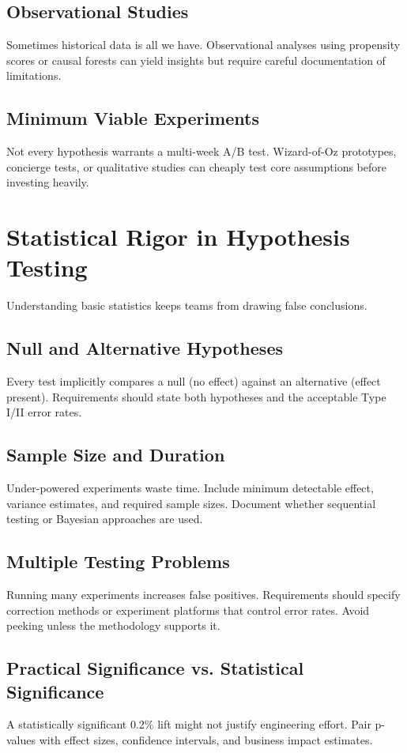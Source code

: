 \subsection{Observational Studies}
Sometimes historical data is all we have. Observational analyses using propensity scores or causal forests can yield insights but require careful documentation of limitations.

\subsection{Minimum Viable Experiments}
Not every hypothesis warrants a multi-week A/B test. Wizard-of-Oz prototypes, concierge tests, or qualitative studies can cheaply test core assumptions before investing heavily.

\section{Statistical Rigor in Hypothesis Testing}
\label{sec:statistical-rigor}

Understanding basic statistics keeps teams from drawing false conclusions.

\subsection{Null and Alternative Hypotheses}
Every test implicitly compares a null (no effect) against an alternative (effect present). Requirements should state both hypotheses and the acceptable Type I/II error rates.

\subsection{Sample Size and Duration}
Under-powered experiments waste time. Include minimum detectable effect, variance estimates, and required sample sizes. Document whether sequential testing or Bayesian approaches are used.

\subsection{Multiple Testing Problems}
Running many experiments increases false positives. Requirements should specify correction methods or experiment platforms that control error rates. Avoid peeking unless the methodology supports it.

\subsection{Practical Significance vs. Statistical Significance}
A statistically significant 0.2\% lift might not justify engineering effort. Pair p-values with effect sizes, confidence intervals, and business impact estimates.

